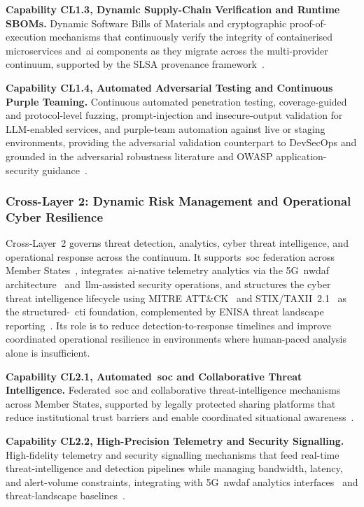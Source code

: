 \documentclass{ieeeaccess}
\begin{document}
\textbf{Capability CL1.3, Dynamic Supply-Chain Verification and Runtime SBOMs.} Dynamic Software Bills of Materials and cryptographic proof-of-execution mechanisms that continuously verify the integrity of containerised microservices and~\gls{ai} components as they migrate across the multi-provider continuum, supported by the SLSA provenance framework~\cite{slsa2023}.

\textbf{Capability CL1.4, Automated Adversarial Testing and Continuous Purple Teaming.} Continuous automated penetration testing, coverage-guided and protocol-level fuzzing, prompt-injection and insecure-output validation for LLM-enabled services, and purple-team automation against live or staging environments, providing the adversarial validation counterpart to DevSecOps and grounded in the adversarial robustness literature and OWASP application-security guidance~\cite{madry2018,owaspllm,owaspapi}.

\subsubsection{Cross-Layer 2: Dynamic Risk Management and Operational Cyber Resilience}
\label{sec:CL2}

Cross-Layer~2 governs threat detection, analytics, cyber threat intelligence, and operational response across the continuum. It supports~\gls{soc} federation across Member States~\cite{concordia2022}, integrates~\gls{ai}-native telemetry analytics via the 5G~\gls{nwdaf} architecture~\cite{tgpp23288} and~\gls{llm}-assisted security operations, and structures the cyber threat intelligence lifecycle using MITRE ATT\&CK~\cite{mitre2020} and STIX/TAXII~2.1~\cite{stix21,taxii21} as the structured-~\gls{cti} foundation, complemented by ENISA threat landscape reporting~\cite{enisaetl2025}. Its role is to reduce detection-to-response timelines and improve coordinated operational resilience in environments where human-paced analysis alone is insufficient.

\textbf{Capability CL2.1, Automated~\gls{soc} and Collaborative Threat Intelligence.} Federated~\gls{soc} and collaborative threat-intelligence mechanisms across Member States, supported by legally protected sharing platforms that reduce institutional trust barriers and enable coordinated situational awareness~\cite{concordia2022}.

\textbf{Capability CL2.2, High-Precision Telemetry and Security Signalling.} High-fidelity telemetry and security signalling mechanisms that feed real-time threat-intelligence and detection pipelines while managing bandwidth, latency, and alert-volume constraints, integrating with 5G~\gls{nwdaf} analytics interfaces~\cite{tgpp23288} and threat-landscape baselines~\cite{enisaetl2025}.
\end{document}
